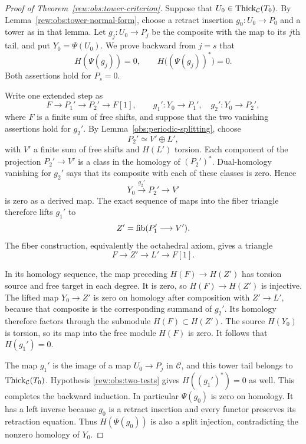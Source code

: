 \begin{proof}[Proof of Theorem~\ref{rew:obs:tower-criterion}]
Suppose that $U_0\in\operatorname{Thick}_{\mathcal C}(T_0)$.
By Lemma~\ref{rew:obs:tower-normal-form}, choose a retract
insertion $g_0:U_0\to P_0$ and a tower as in that lemma.
Let $g_j:U_0\to P_j$ be the composite with the map to its
$j$th tail, and put $Y_0=\Psi(U_0)$.
We prove backward from $j=s$ that
\[
 H(\Psi(g_j))=0,
 \qquad H\bigl((\Psi(g_j))^*\bigr)=0.
\]
Both assertions hold for $P_s=0$.

Write one extended step as
\[
 F\longrightarrow P_1'\longrightarrow P_2'
      \longrightarrow F[1],
 \qquad g_1':Y_0\to P_1',\quad g_2':Y_0\to P_2',
\]
where $F$ is a finite sum of free shifts, and suppose that the
two vanishing assertions hold for $g_2'$.
By Lemma~\ref{obs:periodic-splitting}, choose
\[
 P_2'\simeq V'\oplus L',
\]
with $V'$ a finite sum of free shifts and $H(L')$ torsion.
Each component of the projection $P_2'\to V'$ is a class in
the homology of $(P_2')^*$.  Dual-homology vanishing for $g_2'$
says that its composite with each of these classes is zero.
Hence
\[
 Y_0\xrightarrow{g_2'}P_2'\longrightarrow V'
\]
is zero as a derived map.  The exact sequence of maps into the
fiber triangle therefore lifts $g_1'$ to
\[
 Z'=\operatorname{fib}(P_1'\longrightarrow V').
\]
The fiber construction, equivalently the octahedral axiom, gives
a triangle
\[
 F\longrightarrow Z'\longrightarrow L'\longrightarrow F[1].
\]

In its homology sequence, the map preceding
$H(F)\to H(Z')$ has torsion source and free target in each
degree.  It is zero, so $H(F)\to H(Z')$ is injective.
The lifted map $Y_0\to Z'$ is zero on homology after composition
with $Z'\to L'$, because that composite is the corresponding
summand of $g_2'$.  Its homology therefore factors through
the submodule $H(F)\subset H(Z')$.  The source $H(Y_0)$ is
torsion, so its map into the free module $H(F)$ is zero.
It follows that $H(g_1')=0$.

The map $g_1'$ is the image of a map $U_0\to P_j$ in
$\mathcal C$, and this tower tail belongs to
$\operatorname{Thick}_{\mathcal C}(T_0)$.  Hypothesis
\eqref{rew:obs:two-tests} gives $H((g_1')^*)=0$ as well.
This completes the backward induction.  In particular
$\Psi(g_0)$ is zero on homology.  It has a left inverse because
$g_0$ is a retract insertion and every functor preserves its
retraction equation.  Thus $H(\Psi(g_0))$ is also a split
injection, contradicting the nonzero homology of $Y_0$.
\end{proof}

